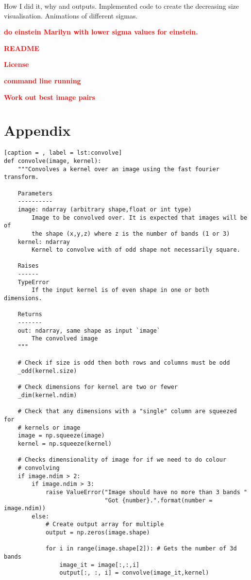 \documentclass[a4paper,10pt]{article}
\newcommand{\todo}[1] {\textbf{\textcolor{red}{#1}}}
\begin{document}
How I did it, why and outputs. Implemented code to create the decreasing size
visualisation. Animations of different sigmas.

\todo{do einstein Marilyn with lower sigma values for einstein.}

\todo{README}

\todo{License}

\todo{command line running}

\todo{Work out best image pairs}

\section{Appendix}

\begin{lstlisting}[caption = , label = lst:convolve]
def convolve(image, kernel):
    """Convolves a kernel over an image using the fast fourier transform.

    Parameters
    ----------
    image: ndarray (arbitrary shape,float or int type)
        Image to be convolved over. It is expected that images will be of
        the shape (x,y,z) where z is the number of bands (1 or 3)
    kernel: ndarray
        Kernel to convolve with of odd shape not necessarily square.

    Raises
    ------
    TypeError
        If the input kernel is of even shape in one or both dimensions.

    Returns
    -------
    out: ndarray, same shape as input `image`
        The convolved image
    """

    # Check if size is odd then both rows and columns must be odd
    _odd(kernel.size)

    # Check dimensions for kernel are two or fewer
    _dim(kernel.ndim)

    # Check that any dimensions with a "single" column are squeezed for
    # kernels or image
    image = np.squeeze(image)
    kernel = np.squeeze(kernel)

    # Checks dimensionality of image for if we need to do colour
    # convolving
    if image.ndim > 2:
        if image.ndim > 3:
            raise ValueError("Image should have no more than 3 bands "
                             "Got {number}.".format(number = image.ndim))
        else:
            # Create output array for multiple
            output = np.zeros(image.shape)

            for i in range(image.shape[2]): # Gets the number of 3d bands
                image_it = image[:,:,i]
                output[:, :, i] = convolve(image_it,kernel)


\end{lstlisting}
\end{document}
